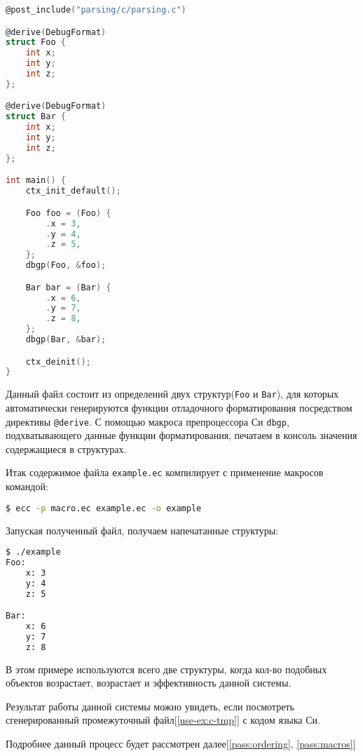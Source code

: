 % 
\begin{lstlisting}[language=c, caption={example.ec}, label={use-ex:source-file}]
@post_include("parsing/c/parsing.c")

@derive(DebugFormat)
struct Foo {
    int x;
    int y;
    int z;
};

@derive(DebugFormat)
struct Bar {
    int x;
    int y;
    int z;
};

int main() {
    ctx_init_default();

    Foo foo = (Foo) {
        .x = 3,
        .y = 4,
        .z = 5,
    };
    dbgp(Foo, &foo);

    Bar bar = (Bar) {
        .x = 6,
        .y = 7,
        .z = 8,
    };
    dbgp(Bar, &bar);

    ctx_deinit();
}
\end{lstlisting}

Данный файл состоит из определений двух структур(\verb|Foo| и \verb|Bar|), для которых автоматически генерируются функции отладочного форматирования посредством директивы \verb|@derive|.
С помощью макроса препроцессора Си \verb|dbgp|, подхватывающего данные функции форматирования, печатаем в консоль значения содержащиеся в структурах.

Итак содержимое файла \verb|example.ec| компилирует с применение макросов командой:
\begin{lstlisting}[language=Bash]
$ ecc -p macro.ec example.ec -o example
\end{lstlisting}

Запуская полученный файл, получаем напечатанные структуры:
\begin{lstlisting}[language=Bash]
$ ./example
Foo:
    x: 3
    y: 4
    z: 5

Bar:
    x: 6
    y: 7
    z: 8
\end{lstlisting}

В этом примере используются всего две структуры, когда кол-во подобных объектов возрастает, возрастает и эффективность данной системы.

Результат работы данной системы можно увидеть, если посмотреть сгенерированный промежуточный файл[\ref{use-ex:c-tmp}] с кодом языка Си.



Подробнее данный процесс будет рассмотрен далее[\ref{pass:ordering}, \ref{pass:macros}]

